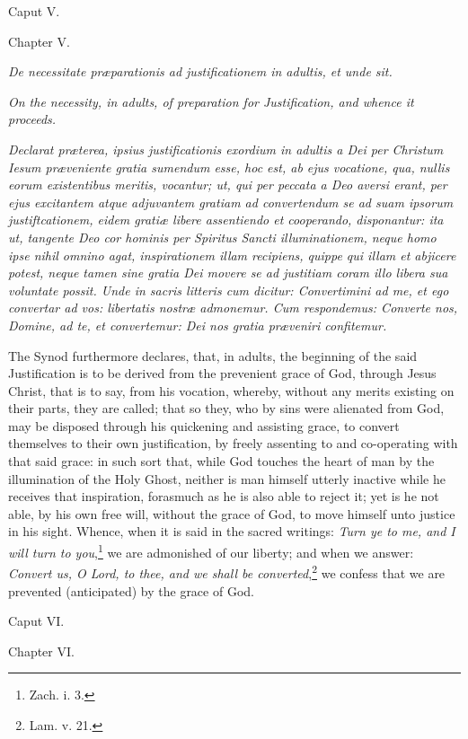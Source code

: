 Caput V.

Chapter V.

\emph{De necessitate præparationis ad justificationem in adultis, et unde sit.}

\emph{On the necessity, in adults, of preparation for Justification, and whence it proceeds.}

\emph{Declarat præterea, ipsius justificationis exordium in adultis a Dei per Christum Iesum præveniente gratia sumendum esse, hoc est, ab ejus vocatione, qua, nullis eorum existentibus meritis, vocantur; ut, qui per peccata a Deo aversi erant, per ejus excitantem atque adjuvantem gratiam ad convertendum se ad suam ipsorum justiftcationem, eidem gratiæ libere assentiendo et cooperando, disponantur: ita ut, tangente Deo cor hominis per Spiritus Sancti illuminationem, neque homo ipse nihil omnino agat, inspirationem illam recipiens, quippe qui illam et abjicere potest, neque tamen sine gratia Dei movere se ad justitiam coram illo libera sua voluntate possit. Unde in sacris litteris cum dicitur: Convertimini ad me, et ego convertar ad vos: libertatis nostræ admonemur. Cum respondemus: Converte nos, Domine, ad te, et convertemur: Dei nos gratia præveniri confitemur.}

The Synod furthermore declares, that, in adults, the beginning of the said Justification is to be derived from the prevenient grace of God, through Jesus Christ, that is to say, from his vocation, whereby, without any merits existing on their parts, they are called; that so they, who by sins were alienated from God, may be disposed through his quickening and assisting grace, to convert themselves to their own justification, by freely assenting to and co-operating with that said grace: in such sort that, while God touches the heart of man by the illumination of the Holy Ghost, neither is man himself utterly inactive while he receives that inspiration, forasmuch as he is also able to reject it; yet is he not able, by his own free will, without the grace of God, to move himself unto justice in his sight. Whence, when it is said in the sacred writings: \emph{Turn ye to me, and I will turn to you},\footnote{\par   Zach. i. 3.} we are admonished of our liberty; and when we answer: \emph{Convert us, O Lord, to thee, and we shall be converted},\footnote{\par   Lam. v. 21.} we confess that we are prevented (anticipated) by the grace of God.

Caput VI.

Chapter VI.

